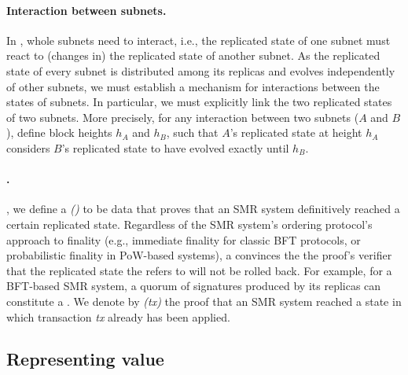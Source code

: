 
\paragraph{Interaction between subnets.}
In \ipc, whole subnets need to interact, i.e., the replicated state of one subnet must react to (changes in) the replicated state of another subnet.
As the replicated state of every subnet is distributed among its replicas and evolves independently of other subnets,
we must establish a mechanism for interactions between the states of subnets.
In particular, we must explicitly link the two replicated states of two subnets.
More precisely, for any interaction between two subnets ($A$ and $B$), define block heights $h_A$ and $h_B$,
such that $A$'s replicated state at height $h_A$ considers $B$'s replicated state to have evolved exactly until $h_B$.

\paragraph{\pofsFull.}, we define a \emph{\pofFull (\pof)} to be data that proves that an SMR system definitively reached a certain replicated state.
Regardless of the SMR system's ordering protocol's approach to finality (e.g., immediate finality for classic BFT protocols, or probabilistic finality in PoW-based systems),
a \pof convinces the the proof's verifier that the replicated state the \pof refers to will not be rolled back.
For example, for a BFT-based SMR system, a quorum of signatures produced by its replicas can constitute a \pof.
We denote by \emph{\pof(tx)} the proof that an SMR system reached a state in which transaction \emph{tx} already has been applied.


\subsection{Representing value}

